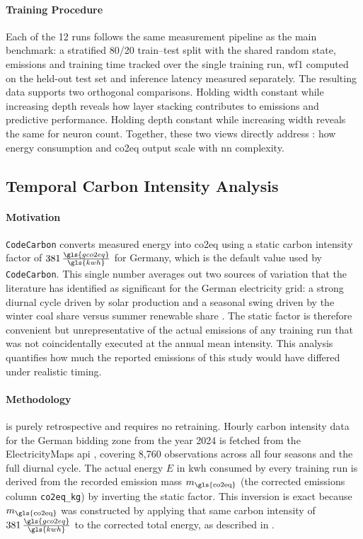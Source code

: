 \paragraph{Training Procedure}
Each of the 12 runs follows the same measurement pipeline as the main benchmark: a stratified 80/20 train--test split with the shared random state, emissions and training time tracked over the single training run, \gls{wf1} computed on the held-out test set and inference latency measured separately. The resulting data supports two orthogonal comparisons. Holding width constant while increasing depth reveals how layer stacking contributes to emissions and predictive performance. Holding depth constant while increasing width reveals the same for neuron count. Together, these two views directly address : how energy consumption and \gls{co2eq} output scale with \gls{nn} complexity.

\subsection{Temporal Carbon Intensity Analysis}
\label{design_carbon_intensity}\label{exp:4}

\paragraph{Motivation}
\texttt{CodeCarbon} converts measured energy into \gls{co2eq} using a static carbon intensity factor of $381\,\frac{\gls{gco2eq}}{\gls{kwh}}$ for Germany, which is the default value used by \texttt{CodeCarbon}. This single number averages out two sources of variation that the literature has identified as significant for the German electricity grid: a strong diurnal cycle driven by solar production and a seasonal swing driven by the winter coal share versus summer renewable share \cite{dodgeMeasuringCarbonIntensity2022}. The static factor is therefore convenient but unrepresentative of the actual emissions of any training run that was not coincidentally executed at the annual mean intensity. This analysis quantifies how much the reported emissions of this study would have differed under realistic timing.

\paragraph{Methodology}
 is purely retrospective and requires no retraining. Hourly carbon intensity data for the German bidding zone from the year 2024 is fetched from the ElectricityMaps \gls{api} \cite{electricityMapsAPI2025}, covering 8{,}760 observations across all four seasons and the full diurnal cycle. The actual energy $E$ in \gls{kwh} consumed by every training run is derived from the recorded emission mass $m_{\text{\gls{co2eq}}}$ (the corrected emissions column \texttt{co2eq\_kg}) by inverting the static factor. This inversion is exact because $m_{\text{\gls{co2eq}}}$ was constructed by applying that same carbon intensity of $381\,\frac{\gls{gco2eq}}{\gls{kwh}}$ to the corrected total energy, as described in .

